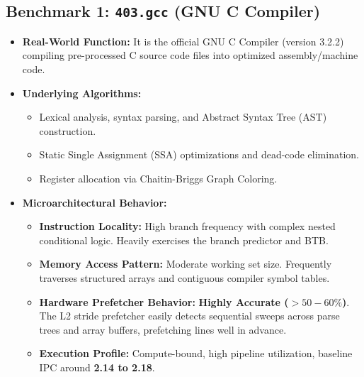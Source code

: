 \documentclass[11pt, a4paper]{article}
\begin{document}
\subsection{Benchmark 1: \texttt{403.gcc} (GNU C Compiler)}
\begin{itemize}[leftmargin=1.5em]
  \item \textbf{Real-World Function:} It is the official GNU C Compiler (version 3.2.2) compiling pre-processed C source code files into optimized assembly/machine code.
  \item \textbf{Underlying Algorithms:}
  \begin{itemize}
    \item Lexical analysis, syntax parsing, and Abstract Syntax Tree (AST) construction.
    \item Static Single Assignment (SSA) optimizations and dead-code elimination.
    \item Register allocation via Chaitin-Briggs Graph Coloring.
  \end{itemize}
  \item \textbf{Microarchitectural Behavior:}
  \begin{itemize}
    \item \textbf{Instruction Locality:} High branch frequency with complex nested conditional logic. Heavily exercises the branch predictor and BTB.
    \item \textbf{Memory Access Pattern:} Moderate working set size. Frequently traverses structured arrays and contiguous compiler symbol tables.
    \item \textbf{Hardware Prefetcher Behavior:} \textbf{Highly Accurate ($>50-60\%$)}. The L2 stride prefetcher easily detects sequential sweeps across parse trees and array buffers, prefetching lines well in advance.
    \item \textbf{Execution Profile:} Compute-bound, high pipeline utilization, baseline IPC around \textbf{2.14 to 2.18}.
  \end{itemize}
\end{itemize}
\end{document}
